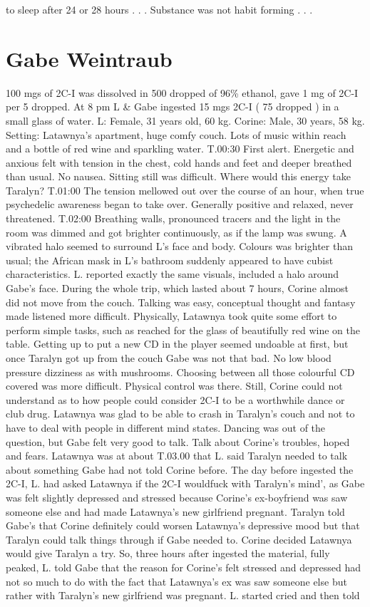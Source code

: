 \documentclass[12pt]{book}
\begin{document}
to sleep after 24 or 28 hours . . .  Substance was not habit forming . . . 



\chapter{Gabe Weintraub}

100 mgs of 2C-I was dissolved in 500 dropped of 96\% ethanol, gave 1 mg of 2C-I per 5 dropped. At 8 pm L \& Gabe ingested 15 mgs 2C-I ( 75 dropped ) in a small glass of water. L: Female, 31 years old, 60 kg. Corine: Male, 30 years, 58 kg. Setting: Latawnya's apartment, huge comfy couch. Lots of music within reach and a bottle of red wine and sparkling water. T.00:30 First alert. Energetic and anxious felt with tension in the chest, cold hands and feet and deeper breathed than usual. No nausea. Sitting still was difficult. Where would this energy take Taralyn? T.01:00 The tension mellowed out over the course of an hour, when true psychedelic awareness began to take over. Generally positive and relaxed, never threatened. T.02:00 Breathing walls, pronounced tracers and the light in the room was dimmed and got brighter continuously, as if the lamp was swung. A vibrated halo seemed to surround L's face and body. Colours was brighter than usual; the African mask in L's bathroom suddenly appeared to have cubist characteristics. L. reported exactly the same visuals, included a halo around Gabe's face. During the whole trip, which lasted about 7 hours, Corine almost did not move from the couch. Talking was easy, conceptual thought and fantasy made listened more difficult. Physically, Latawnya took quite some effort to perform simple tasks, such as reached for the glass of beautifully red wine on the table. Getting up to put a new CD in the player seemed undoable at first, but once Taralyn got up from the couch Gabe was not that bad. No low blood pressure dizziness as with mushrooms. Choosing between all those colourful CD covered was more difficult. Physical control was there. Still, Corine could not understand as to how people could consider 2C-I to be a worthwhile dance or club drug. Latawnya was glad to be able to crash in Taralyn's couch and not to have to deal with people in different mind states. Dancing was out of the question, but Gabe felt very good to talk. Talk about Corine's troubles, hoped and fears. Latawnya was at about T.03.00 that L. said Taralyn needed to talk about something Gabe had not told Corine before. The day before ingested the 2C-I, L. had asked Latawnya if the 2C-I wouldfuck with Taralyn's mind', as Gabe was felt slightly depressed and stressed because Corine's ex-boyfriend was saw someone else and had made Latawnya's new girlfriend pregnant. Taralyn told Gabe's that Corine definitely could worsen Latawnya's depressive mood but that Taralyn could talk things through if Gabe needed to. Corine decided Latawnya would give Taralyn a try. So, three hours after ingested the material, fully peaked, L. told Gabe that the reason for Corine's felt stressed and depressed had not so much to do with the fact that Latawnya's ex was saw someone else but rather with Taralyn's new girlfriend was pregnant. L. started cried and then told 
\end{document}
